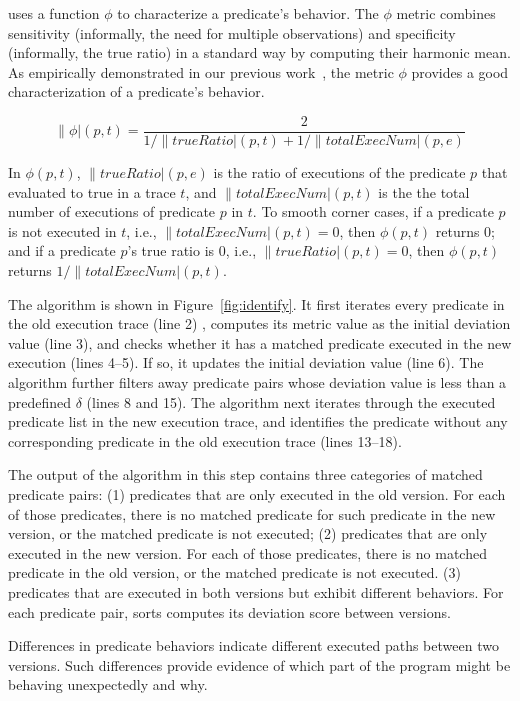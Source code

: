 \ourtool uses a function $\phi$ to characterize a predicate's behavior.
The $\phi$ metric combines sensitivity (informally, the need
for multiple observations) and specificity (informally, the
true ratio) in a standard way by computing their harmonic mean.
As empirically demonstrated in our previous work~\cite{Zhang:2013:ADS},
the metric $\phi$ provides a good characterization of a predicate's behavior.

\vspace{-1mm}

{\small{
\[
\|\phi|(p, t) = \frac{2}{{1}/{\|trueRatio|(p, t)} + {1}/{\|totalExecNum|(p, e)}}
\]
}}

\vspace{-1mm}

In $\phi(p, t)$, $\|trueRatio|(p, e)$ is the ratio of executions of the
predicate $p$ that evaluated to true in a trace $t$,
and $\|totalExecNum|(p, t)$ is the the total
number of executions of predicate $p$ in $t$.
To smooth corner cases, if a predicate $p$ is not executed in $t$, 
i.e., $\|totalExecNum|(p, t) = 0$, then $\phi(p, t)$ returns 0;
and if a predicate $p$'s true ratio is 0, i.e., $\|trueRatio|(p, t) = 0$,
then $\phi(p, t)$ returns $1/\|totalExecNum|(p, t)$.

The algorithm is shown in Figure~\ref{fig:identify}.
It first iterates every predicate in the old execution trace (line 2)
, computes its metric value as the initial deviation value (line 3), and
checks whether it has a matched predicate executed in the
new execution (lines 4--5). If so, it updates the
initial deviation value (line 6). The algorithm further filters away
predicate pairs whose deviation value is less than a predefined $\delta$ (lines 8 and 15). The algorithm next iterates through the executed predicate list
in the new execution trace, and identifies the predicate without any
corresponding predicate in the old execution trace (lines 13--18).

The output of the algorithm in this step contains three categories
of matched predicate pairs:
(1) predicates that are only executed in the
old version. For each of those predicates, there is no matched predicate
for such predicate in the new version, or the matched predicate
is not executed; (2) predicates that are only executed
in the new version. For each of those predicates, there is
no matched predicate in the old version, or the matched predicate
is not executed. (3) predicates that
are executed in both versions but exhibit different
behaviors. For each predicate pair, \ourtool sorts computes
its deviation score between versions.


Differences in predicate behaviors indicate different executed paths
between two versions. Such differences provide evidence of
which part of the program might be behaving unexpectedly and why.


